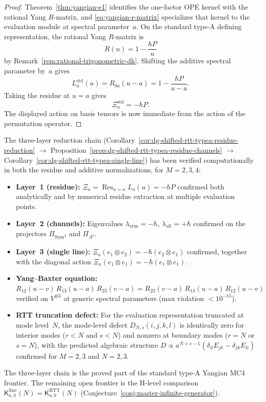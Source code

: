 \begin{proof}
Theorem~\ref{thm:yangian-e1} identifies the one-factor OPE kernel with
the rational Yang $R$-matrix, and
\eqref{eq:yangian-r-matrix} specializes that kernel to the evaluation
module at spectral parameter~$a$.  On the standard type-A defining
representation, the rational Yang $R$-matrix is
\[
R(u)=1-\frac{\hbar P}{u}
\]
by Remark~\ref{rem:rational-trigonometric-dk}.  Shifting the additive
spectral parameter by~$a$ gives
\[
L_a^{\mathrm{std}}(u)=R_{0a}(u-a)=1-\frac{\hbar P}{u-a}.
\]
Taking the residue at $u=a$ gives
\[
\Xi_a^{\mathrm{std}}=-\hbar P.
\]
The displayed action on basis tensors is now immediate from the action
of the permutation operator.
\end{proof}


\begin{computation}
\label{comp:mc4-three-layer-verification}
The three-layer reduction chain
(Corollary~\ref{cor:dg-shifted-rtt-typea-residue-reduction}
$\to$
Proposition~\ref{prop:dg-shifted-rtt-typea-residue-channels}
$\to$
Corollary~\ref{cor:dg-shifted-rtt-typea-single-line})
has been verified computationally in both
the residue and additive normalizations, for
$M = 2, 3, 4$:
\begin{itemize}
\item \textbf{Layer~1 (residue):}
  $\Xi_a = \operatorname*{Res}_{u=a}L_a(u) = -\hbar P$ confirmed
  both analytically and by numerical residue extraction at multiple
  evaluation points.
\item \textbf{Layer~2 (channels):}
  Eigenvalues $\lambda_{\mathrm{sym}} = -\hbar$,
  $\lambda_{\mathrm{alt}} = +\hbar$ confirmed on the projectors
  $\Pi_{\mathrm{Sym}^2}$ and $\Pi_{\Lambda^2}$.
\item \textbf{Layer~3 (single line):}
  $\Xi_a(e_1\otimes e_2) = -\hbar(e_2\otimes e_1)$ confirmed,
  together with the diagonal action
  $\Xi_a(e_1\otimes e_1) = -\hbar(e_1\otimes e_1)$.
\item \textbf{Yang--Baxter equation:}
  $R_{12}(u{-}v)\,R_{13}(u{-}a)\,R_{23}(v{-}a)
  = R_{23}(v{-}a)\,R_{13}(u{-}a)\,R_{12}(u{-}v)$
  verified on $V^{\otimes 3}$ at generic spectral parameters
  (max violation $< 10^{-15}$).
\item \textbf{RTT truncation defect:}
  For the evaluation representation truncated at mode level~$N$,
  the mode-level defect $D_{N,s}(i,j,k,l)$ is identically zero for
  interior modes ($r < N$ and $s < N$) and nonzero at boundary
  modes ($r = N$ or $s = N$), with the predicted algebraic structure
  $D \propto a^{N+s-1}(\delta_{il}E_{jk} - \delta_{jk}E_{li})$
  confirmed for $M = 2, 3$ and $N = 2, 3$.
\end{itemize}
The three-layer chain is the proved part of the standard type-A
Yangian MC4 frontier.  The remaining open frontier is the
H-level comparison
$\mathsf{K}^{\mathrm{line}}_{a,b}(N) = \mathsf{K}^{\mathrm{RTT}}_{a,b}(N)$
(Conjecture~\ref{conj:master-infinite-generator}).
\end{computation}

